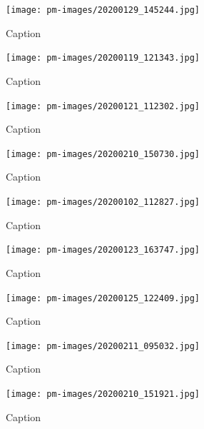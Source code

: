         \clearpage
        
\begin{figure}[]
\centering
\texttt{[image: pm-images/20200129\_145244.jpg]}
\caption{Caption}
\end{figure}

        \clearpage
        
\begin{figure}[]
\centering
\texttt{[image: pm-images/20200119\_121343.jpg]}
\caption{Caption}
\end{figure}

        \clearpage
        
\begin{figure}[]
\centering
\texttt{[image: pm-images/20200121\_112302.jpg]}
\caption{Caption}
\end{figure}

        \clearpage
        
\begin{figure}[]
\centering
\texttt{[image: pm-images/20200210\_150730.jpg]}
\caption{Caption}
\end{figure}

        \clearpage
        
\begin{figure}[]
\centering
\texttt{[image: pm-images/20200102\_112827.jpg]}
\caption{Caption}
\end{figure}

        \clearpage
        
\begin{figure}[]
\centering
\texttt{[image: pm-images/20200123\_163747.jpg]}
\caption{Caption}
\end{figure}

        \clearpage
        
\begin{figure}[]
\centering
\texttt{[image: pm-images/20200125\_122409.jpg]}
\caption{Caption}
\end{figure}

        \clearpage
        
\begin{figure}[]
\centering
\texttt{[image: pm-images/20200211\_095032.jpg]}
\caption{Caption}
\end{figure}

        \clearpage
        
\begin{figure}[]
\centering
\texttt{[image: pm-images/20200210\_151921.jpg]}
\caption{Caption}
\end{figure}

